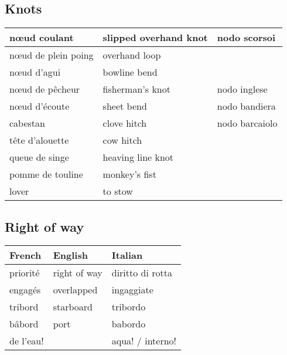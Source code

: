 \documentclass[a4paper, 12pt, twoside]{article}
\begin{document}
\begin{indt}{\section{Knots}}
\begin{tabular}{|l|l|l|}
            \hline %
            n\oe ud coulant %
            & slipped overhand knot
            & nodo scorsoi
            \\
            \hline %
            n\oe ud de plein poing %
            & overhand loop
            &
            \\
            \hline %
            n\oe ud d'agui %
            & bowline bend
            &
            \\
            \hline %
            n\oe ud de pêcheur %
            & fisherman's knot
            & nodo inglese
            \\
            \hline %
            n\oe ud d'écoute %
            & sheet bend
            & nodo bandiera
            \\
            \hline %
            cabestan %
            & clove hitch
            & nodo barcaiolo
            \\
            \hline %
            tête d'alouette %
            & cow hitch
            &
            \\
            \hline %
            queue de singe %
            & heaving line knot
            &
            \\
            \hline %
            pomme de touline %
            & monkey's fist
            &
            \\
            \hline %
            lover %
            & to stow
            &
            \\
            \hline %
        \end{tabular}
    \end{indt} %

    \begin{indt}{\section{Right of way}} %
        \begin{tabular}{|l|l|l|}
            \hline %
            \textbf{French}
            & \textbf{English}
            & \textbf{Italian}
            \\
            \hline
            \hline %
            priorité %
            & right of way
            & diritto di rotta
            \\
            \hline %
            engagés %
            & overlapped
            & ingaggiate
            \\
            \hline %
            tribord %
            & starboard
            & tribordo
            \\
            \hline %
            bâbord %
            & port
            & babordo
            \\
            \hline %
            de l'eau! %
            &
            & aqua! / interno!
            \\
            \hline %
        \end{tabular}
    \end{indt} %
\end{document}
